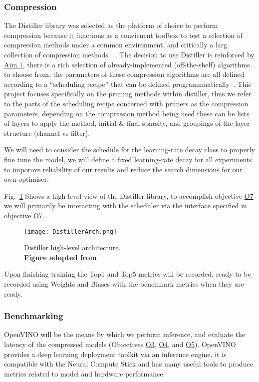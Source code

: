\documentclass[../D1.tex]{subfiles}
\begin{document}
\subsubsection{Compression}
The Distiller library was selected as the platform of choice to perform compression because it functions as a convienent toolbox to test a selection of compression methods under a common environment, and critically a larg collection of compression methods~~\autocite{zmoraNeuralNetworkDistiller2019}.
The decision to use Distiller is reinforced by \hyperref[Aim1]{Aim 1}, there is a rich selection of already-implemented (off-the-shelf) algorithms to choose from, the parameters of these compression algorithms are all defined according to a ``scheduling recipe'' that can be defined programmaatically~\autocite{zmoraNeuralNetworkDistiller2019}.
This project focuses specifically on the pruning methods within distiller, thus we refer to the parts of the scheduling recipe concerned with pruners as the compression parameters, depending on the compression method being used these can be lists of layers to apply the method, initial \& final sparsity, and groupings of the layer structure (channel vs filter).


We will need to consider the schedule for the learning-rate decay class to properly fine tune the model, we will define a fixed learning-rate decay for all experiments to imporove reliability of our results and reduce the search dimensions for our own optimiser.

Fig.~\ref{fig:DistillerArch} Shows a high level view of the Distiller library, to accomplish objective \hyperref[obj:CompPara]{O7} we will primarily be interacting with the scheduler via the interface specified in objective \hyperref[obj:CompPara]{O7}.

\begin{figure}[h]
    \texttt{[image: DistillerArch.png]}
    \caption{Distiller high-level architecture.\\ \textbf{Figure adopted from~\autocite{zmoraNeuralNetworkDistiller2019}}}
    \label{fig:DistillerArch}
\end{figure}

Upon finishing training the Top1 and Top5 metrics will be recorded, ready to be recorded using Weights and Biases with the benchmark metrics when they are ready. 

\subsubsection{Benchmarking}
OpenVINO will be the means by which we perform inference, and evaluate the latency of the compressed models (Objectives \hyperref[obj:EvalE2E]{O3}, \hyperref[obj:EvalLayer]{O4}, and \hyperref[obj:EvalComp]{O5}).
OpenVINO provides a deep learning deployment toolkit via an inference engine, it is compatible with the Neural Compute Stick and has many useful tools to produce metrics related to model and hardware performance.
\end{document}

